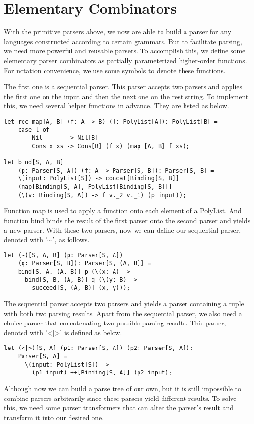 \section{Elementary Combinators}
With the primitive parsers above, we now are able to build a parser for any languages constructed according to certain grammars. But to facilitate parsing, we need more powerful and reusable parsers. To accomplish this, we define some elementary parser combinators as partially parameterized higher-order functions. For notation convenience, we use some symbols to denote these functions.

The first one is a sequential parser. This parser accepts two parsers and applies the first one on the input and then the next one on the rest string. To implement this, we need several helper functions in advance. They are listed as below.
\begin{lstlisting}
let rec map[A, B] (f: A -> B) (l: PolyList[A]): PolyList[B] =
    case l of
        Nil       -> Nil[B]
     |  Cons x xs -> Cons[B] (f x) (map [A, B] f xs);
     
let bind[S, A, B] 
    (p: Parser[S, A]) (f: A -> Parser[S, B]): Parser[S, B] =
    \(input: PolyList[S]) -> concat[Binding[S, B]] 
    (map[Binding[S, A], PolyList[Binding[S, B]]] 
    (\(v: Binding[S, A]) -> f v._2 v._1) (p input));
\end{lstlisting}
Function map is used to apply a function onto each element of a PolyList. And function bind binds the result of the first parser onto the second parser and yields a new parser. With these two parsers, now we can define our sequential parser, denoted with '$\sim$', as follows.
\begin{lstlisting}
let (~)[S, A, B] (p: Parser[S, A]) 
    (q: Parser[S, B]): Parser[S, (A, B)] =
	bind[S, A, (A, B)] p (\(x: A) -> 
	  bind[S, B, (A, B)] q (\(y: B) -> 
	    succeed[S, (A, B)] (x, y)));
\end{lstlisting}
The sequential parser accepts two parsers and yields a parser containing a tuple with both two parsing results. Apart from the sequential parser, we also need a choice parser that concatenating two possible parsing results. This parser, denoted with '<|>' is defined as below.
\begin{lstlisting}
let (<|>)[S, A] (p1: Parser[S, A]) (p2: Parser[S, A]): 
    Parser[S, A] =
	  \(input: PolyList[S]) -> 
	    (p1 input) ++[Binding[S, A]] (p2 input);
\end{lstlisting}
Although now we can build a parse tree of our own, but it is still impossible to combine parsers arbitrarily since these parsers yield different results. To solve this, we need some parser transformers that can alter the parser's result and transform it into our desired one.

